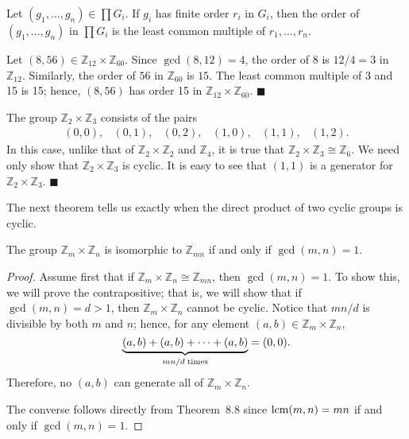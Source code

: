 \begin{corollary}
Let $(g_1, \ldots, g_n) \in \prod G_i$. If $g_i$ has finite order
$r_i$ in $G_i$, then the order of $(g_1, \ldots, g_n)$ in $\prod G_i$
is the least common multiple of $r_1, \ldots, r_n$.
\end{corollary}
 
 
\medskip

 
Let $(8, 56) \in {\mathbb Z}_{12} \times  {\mathbb Z}_{60}$. Since
$\gcd(8,12) = 4$, the order of 8 is $12/4 = 3$ in ${\mathbb Z}_{12}$.
Similarly, the order of $56$ in ${\mathbb Z}_{60}$ is $15$. The least
common multiple of 3 and 15 is 15; hence, $(8, 56)$ has order 15 in
${\mathbb Z}_{12} \times  {\mathbb Z}_{60}$.
\hspace{\fill} $\blacksquare$
 

\medskip

 
The group ${\mathbb Z}_2 \times {\mathbb Z}_3$ consists of the pairs
$$
\begin{array}{cccccc}
(0,0),& (0, 1),& (0, 2),& (1,0),& (1, 1),& (1, 2).
\end{array}
$$
In this case, unlike that of ${\mathbb Z}_2 \times {\mathbb Z}_2$ and
${\mathbb Z}_4$, it 
is true that ${\mathbb Z}_2  \times {\mathbb Z}_3 \cong {\mathbb Z}_6$. We need
only show that ${\mathbb Z}_2  \times {\mathbb Z}_3$ is cyclic.  It is
easy to see that $(1,1)$ is a generator for ${\mathbb Z}_2  \times {\mathbb
Z}_3$. 
\hspace{\fill} $\blacksquare$
 

\medskip

 
The next theorem tells us exactly when the direct product of two
cyclic groups is cyclic. 
 

\begin{theorem}
The group ${\mathbb Z}_m \times {\mathbb Z}_n$ is isomorphic to ${\mathbb
Z}_{mn}$ if and only if $\gcd(m,n)=1$. 
\end{theorem}
 

\begin{proof}
Assume first that if ${\mathbb Z}_m \times {\mathbb Z}_n \cong {\mathbb
Z}_{mn}$, then $\gcd(m, n) = 1$. To show this, we will prove the
contrapositive; that is, we will show that if $\gcd(m, n) = d >
1$, then ${\mathbb Z}_m \times {\mathbb Z}_n$ cannot be cyclic. Notice that
$mn/d$ is divisible by both $m$ and $n$; hence, for any element $(a,b)
\in {\mathbb Z}_m \times {\mathbb Z}_n$,  
$$
\underbrace{(a,b) + (a,b)+ \cdots + (a,b)}_{mn/d \; {\rm
times}}
= (0, 0).
$$
Therefore, no $(a, b)$ can generate all of ${\mathbb Z}_m \times {\mathbb
Z}_n$. 

 
The converse follows directly from Theorem~8.8 since
$\operatorname{lcm}(m,n) = mn$ if and only if $\gcd(m,n)=1$. 
\end{proof}
 

